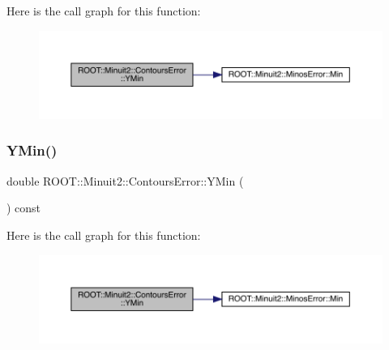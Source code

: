 Here is the call graph for this function\+:
\nopagebreak
\begin{figure}[H]
\begin{center}
\leavevmode
\includegraphics[width=350pt]{d3/de9/classROOT_1_1Minuit2_1_1ContoursError_ac2bd4c328fe62d04b2809d9e0730efe3_cgraph}
\end{center}
\end{figure}
\mbox{\label{classROOT_1_1Minuit2_1_1ContoursError_ac2bd4c328fe62d04b2809d9e0730efe3}} 
\subsubsection{\texorpdfstring{YMin()}{YMin()}\hspace{0.1cm}{\footnotesize\ttfamily [3/3]}}
{\footnotesize\ttfamily double R\+O\+O\+T\+::\+Minuit2\+::\+Contours\+Error\+::\+Y\+Min (\begin{DoxyParamCaption}{ }\end{DoxyParamCaption}) const\hspace{0.3cm}{\ttfamily [inline]}}

Here is the call graph for this function\+:
\nopagebreak
\begin{figure}[H]
\begin{center}
\leavevmode
\includegraphics[width=350pt]{d3/de9/classROOT_1_1Minuit2_1_1ContoursError_ac2bd4c328fe62d04b2809d9e0730efe3_cgraph}
\end{center}
\end{figure}
\mbox{\label{classROOT_1_1Minuit2_1_1ContoursError_a181d8326a32d95dd0f619bcb63076c00}} 
